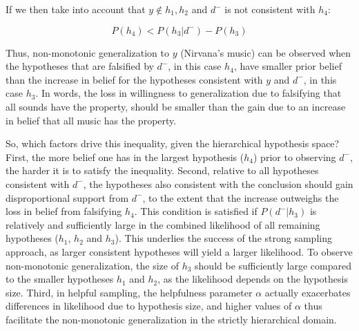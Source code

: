 \documentclass[authoryear,11pt]{elsarticle}
\begin{document}
\noindent If we then take into account that $y \notin h_1, h_2$ and $d^-$ is not consistent with $h_4$:

$$P(h_4) < P(h_3|d^-) - P(h_3)$$

Thus, non-monotonic generalization to $y$ (Nirvana's music) can be observed when the hypotheses that are falsified by $d^-$, in this case $h_4$, have smaller prior belief than the increase in belief for the hypotheses consistent with $y$ and $d^-$, in this case $h_3$. In words, the loss in willingness to generalization due to falsifying that all sounds have the property, should be smaller than the gain due to an increase in belief that all music has the property.

So, which factors drive this inequality, given the hierarchical hypothesis space? First, the more belief one has in the largest hypothesis ($h_4$) prior to observing $d^-$, the harder it is to satisfy the inequality. Second, relative to all hypotheses consistent with $d^-$, the hypotheses also consistent with the conclusion should gain disproportional support from $d^-$, to the extent that the increase outweighs the loss in belief from falsifying $h_4$. This condition is satisfied if $P(d^-|h_3)$ is relatively and sufficiently large in the combined likelihood of all remaining hypotheses ($h_1$, $h_2$ and $h_3$). This underlies the success of the strong sampling approach, as larger consistent hypotheses will yield a larger likelihood. To observe non-monotonic generalization, the size of $h_3$ should be sufficiently large compared to the smaller hypotheses $h_1$ and $h_2$, as the likelihood depends on the hypothesis size. Third, in helpful sampling, the helpfulness parameter $\alpha$ actually exacerbates differences in likelihood due to hypothesis size, and higher values of $\alpha$ thus facilitate the non-monotonic generalization in the strictly hierarchical domain.
\end{document}
